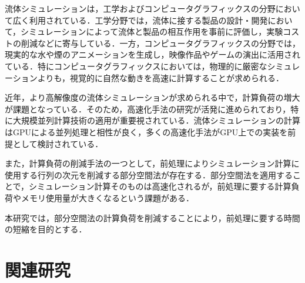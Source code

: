 \documentclass[a4j,12pt]{jreport}
\begin{document}
流体シミュレーションは，工学およびコンピュータグラフィックスの分野において広く利用されている．工学分野では，流体に接する製品の設計・開発において，シミュレーションによって流体と製品の相互作用を事前に評価し，実験コストの削減などに寄与している．一方，コンピュータグラフィックスの分野では，現実的な水や煙のアニメーションを生成し，映像作品やゲームの演出に活用されている．特にコンピュータグラフィックスにおいては，物理的に厳密なシミュレーションよりも，視覚的に自然な動きを高速に計算することが求められる．

近年，より高解像度の流体シミュレーションが求められる中で，計算負荷の増大が課題となっている．そのため，高速化手法の研究が活発に進められており，特に大規模並列計算技術の適用が重要視されている．流体シミュレーションの計算はGPUによる並列処理と相性が良く，多くの高速化手法がGPU上での実装を前提として検討されている．

また，計算負荷の削減手法の一つとして，前処理によりシミュレーション計算に使用する行列の次元を削減する部分空間法が存在する．部分空間法を適用することで，シミュレーション計算そのものは高速化されるが，前処理に要する計算負荷やメモリ使用量が大きくなるという課題がある．

本研究では，部分空間法の計算負荷を削減することにより，前処理に要する時間の短縮を目的とする．
\chapter{関連研究} \label{chapter:2}
\end{document}
